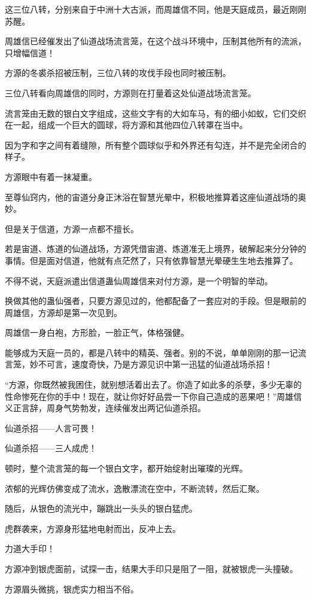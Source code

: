 \begin{this_body}
这三位八转，分别来自于中洲十大古派，而周雄信不同，他是天庭成员，最近刚刚苏醒。

周雄信已经催发出了仙道战场流言笼，在这个战斗环境中，压制其他所有的流派，只增幅信道！

方源的冬裘杀招被压制，三位八转的攻伐手段也同时被压制。

三位八转看向周雄信的同时，方源则在打量着这处仙道战场流言笼。

流言笼由无数的银白文字组成，这些文字有的大如车马，有的细小如蚁，它们交织在一起，组成一个巨大的圆球，将方源和其他四位八转罩在当中。

因为字和字之间有着缝隙，所有整个圆球似乎和外界还有勾连，并不是完全闭合的样子。

方源眼中有着一抹凝重。

至尊仙窍内，他的宙道分身正沐浴在智慧光晕中，积极地推算着这座仙道战场的奥妙。

但是关于信道，方源一点都不擅长。

若是宙道、炼道的仙道战场，方源凭借宙道、炼道准无上境界，破解起来分分钟的事情。但是面对信道，他就有点茫然了，只有依靠智慧光晕硬生生地去推算了。

不得不说，天庭派遣出信道蛊仙周雄信来对付方源，是一个明智的举动。

换做其他的蛊仙强者，只要方源见过的，他都配备了一套应对的手段。但是眼前的周雄信，方源却是第一次见到。

周雄信一身白袍，方形脸，一脸正气，体格强健。

能够成为天庭一员的，都是八转中的精英、强者。别的不说，单单刚刚的那一记流言笼，妙不可言，速度奇快，乃是方源见识中第一迅猛的仙道战场杀招！

“方源，你既然被我困住，就别想活着出去了。你造了如此多的杀孽，多少无辜的性命惨死在你的手中！现在，就让你好好品尝一下你自己造成的恶果吧！”周雄信义正言辞，周身气势勃发，连续催发出两记仙道杀招。

仙道杀招——人言可畏！

仙道杀招——三人成虎！

顿时，整个流言笼的每一个银白文字，都开始绽射出璀璨的光辉。

浓郁的光辉仿佛变成了流水，逸散漂流在空中，不断流转，然后汇聚。

随后，从银色的流光中，蹦跳出一头头的银白猛虎。

虎群袭来，方源身形猛地电射而出，反冲上去。

力道大手印！

方源冲到银虎面前，试探一击，结果大手印只是阻了一阻，就被银虎一头撞破。

方源眉头微挑，银虎实力相当不俗。


\end{this_body}
